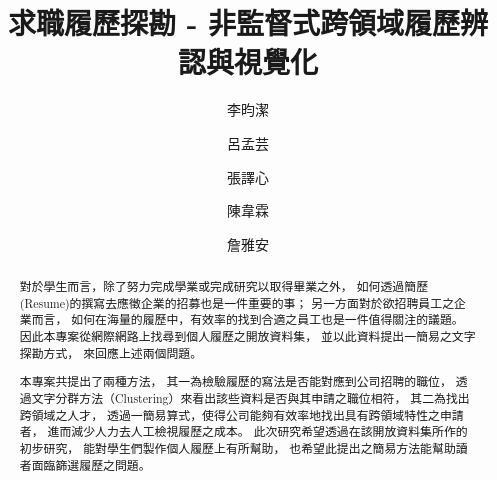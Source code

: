 \documentclass[sigconf]{acmart}
\begin{document}
\title{求職履歷探勘 - 非監督式跨領域履歷辨認與視覺化}


\author{李昀潔}
\author{呂孟芸}
\author{張譯心}
\author{陳韋霖}
\author{詹雅安}


\begin{abstract}
    對於學生而言，除了努力完成學業或完成研究以取得畢業之外，
    如何透過簡歷(Resume)的撰寫去應徵企業的招募也是一件重要的事；
    另一方面對於欲招聘員工之企業而言，
    如何在海量的履歷中，有效率的找到合適之員工也是一件值得關注的議題。
    因此本專案從網際網路上找尋到個人履歷之開放資料集，
    並以此資料提出一簡易之文字探勘方式，
    來回應上述兩個問題。

    本專案共提出了兩種方法，
    其一為檢驗履歷的寫法是否能對應到公司招聘的職位，
    透過文字分群方法（Clustering）來看出該些資料是否與其申請之職位相符，
    其二為找出跨領域之人才，
    透過一簡易算式，使得公司能夠有效率地找出具有跨領域特性之申請者，
    進而減少人力去人工檢視履歷之成本。
    此次研究希望透過在該開放資料集所作的初步研究，
    能對學生們製作個人履歷上有所幫助，
    也希望此提出之簡易方法能幫助讀者面臨篩選履歷之問題。
\end{abstract}

\end{document}
